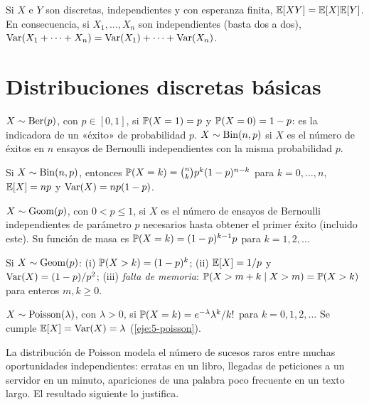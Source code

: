 \begin{proposicion}\label{prop:t5-producto}
Si $X$ e $Y$ son discretas, independientes y con esperanza finita, $\mathbb{E}[XY]=\mathbb{E}[X]\mathbb{E}[Y]$. En consecuencia, si $X_1,\dots,X_n$ son independientes (basta dos a dos), $\operatorname{Var}(X_1+\dots+X_n)=\operatorname{Var}(X_1)+\dots+\operatorname{Var}(X_n)$.
\end{proposicion}

\section{Distribuciones discretas básicas}

\begin{definicion}
$X\sim\operatorname{Ber}(p)$, con $p\in[0,1]$, si $\mathbb{P}(X=1)=p$ y $\mathbb{P}(X=0)=1-p$: es la indicadora de un «éxito» de probabilidad $p$. $X\sim\operatorname{Bin}(n,p)$ si $X$ es el número de éxitos en $n$ ensayos de Bernoulli independientes con la misma probabilidad $p$.
\end{definicion}

\begin{teorema}\label{teo:t5-binomial}
Si $X\sim\operatorname{Bin}(n,p)$, entonces $\mathbb{P}(X=k)=\binom nk p^{k}(1-p)^{n-k}$ para $k=0,\dots,n$, $\mathbb{E}[X]=np$ y $\operatorname{Var}(X)=np(1-p)$.
\end{teorema}

\begin{definicion}[Geométrica]
$X\sim\operatorname{Geom}(p)$, con $0<p\le1$, si $X$ es el número de ensayos de Bernoulli independientes de parámetro $p$ necesarios hasta obtener el primer éxito (incluido este). Su función de masa es $\mathbb{P}(X=k)=(1-p)^{k-1}p$ para $k=1,2,\dots$
\end{definicion}

\begin{proposicion}\label{prop:t5-geom}
Si $X\sim\operatorname{Geom}(p)$: (i) $\mathbb{P}(X>k)=(1-p)^{k}$; (ii) $\mathbb{E}[X]=1/p$ y $\operatorname{Var}(X)=(1-p)/p^{2}$; (iii) \emph{falta de memoria}: $\mathbb{P}(X>m+k\mid X>m)=\mathbb{P}(X>k)$ para enteros $m,k\ge0$.
\end{proposicion}

\begin{definicion}[Poisson]
$X\sim\operatorname{Poisson}(\lambda)$, con $\lambda>0$, si $\mathbb{P}(X=k)=e^{-\lambda}\lambda^{k}/k!$ para $k=0,1,2,\dots$ Se cumple $\mathbb{E}[X]=\operatorname{Var}(X)=\lambda$ (\cref{eje:5-poisson}).
\end{definicion}

La distribución de Poisson modela el número de sucesos raros entre muchas oportunidades independientes: erratas en un libro, llegadas de peticiones a un servidor en un minuto, apariciones de una palabra poco frecuente en un texto largo. El resultado siguiente lo justifica.

